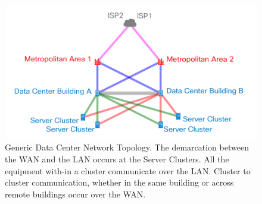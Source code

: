 \begin{figure}[h]
\centering
    \includegraphics[scale=0.2]{traffic_profile/images/net_diag.png}
    \caption[Network Diagram]{Generic Data Center Network Topology. The demarcation between the WAN and the LAN occurs at the Server Clusters. All the equipment with-in a cluster communicate over the LAN. Cluster to cluster communication, whether in the same building or across remote buildings occur over the WAN.}
\label{net_diag}
\end{figure}

